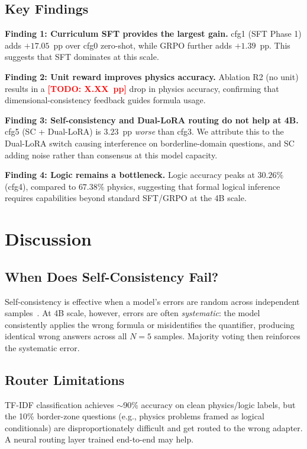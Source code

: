 \documentclass{ieeeaccess}
\newcommand{\todo}[1]{\textcolor{red}{\textbf{[TODO: #1]}}}
\begin{document}
\subsection{Key Findings}

\textbf{Finding 1: Curriculum SFT provides the largest gain.}
cfg1 (SFT Phase 1) adds $+17.05$~pp over cfg0 zero-shot, while
GRPO further adds $+1.39$~pp. This suggests that SFT dominates at this scale.

\textbf{Finding 2: Unit reward improves physics accuracy.}
Ablation R2 (no unit) results in a \todo{X.XX~pp} drop in physics accuracy,
confirming that dimensional-consistency feedback guides formula usage.

\textbf{Finding 3: Self-consistency and Dual-LoRA routing do not help at 4B.}
cfg5 (SC + Dual-LoRA) is $3.23$~pp \emph{worse} than cfg3.
We attribute this to the Dual-LoRA switch causing interference on
borderline-domain questions, and SC adding noise rather than consensus
at this model capacity.

\textbf{Finding 4: Logic remains a bottleneck.}
Logic accuracy peaks at $30.26\%$ (cfg4), compared to $67.38\%$ physics,
suggesting that formal logical inference requires capabilities beyond
standard SFT/GRPO at the 4B scale.

\section{Discussion}
\label{sec:discussion}

\subsection{When Does Self-Consistency Fail?}

Self-consistency is effective when a model's errors are random across
independent samples~\cite{Wang2023sc}. At 4B scale, however, errors are
often \emph{systematic}: the model consistently applies the wrong formula
or misidentifies the quantifier, producing identical wrong answers across all
$N=5$ samples. Majority voting then reinforces the systematic error.

\subsection{Router Limitations}

TF-IDF classification achieves $\sim$90\% accuracy on clean physics/logic
labels, but the 10\% border-zone questions (e.g., physics problems framed
as logical conditionals) are disproportionately difficult and get routed to
the wrong adapter. A neural routing layer trained end-to-end may help.
\end{document}

